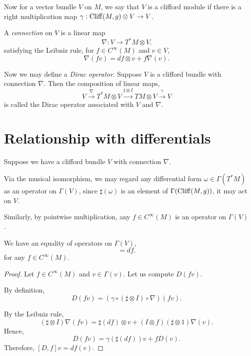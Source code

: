 Now for a vector bundle $V$ on $M$, we say that $V$ is a clifford module
if there is a right multiplication map $\gamma:\operatorname{Cliff}(M,g) \otimes V\rightarrow V$. 

A \emph{connection} on $V$ is a linear map
\begin{equation*}
    \nabla:V\rightarrow T^*M\otimes V.
\end{equation*}
satisfying the Leibniz rule, for $f \in C^\infty(M)$ and $v \in V$,
\begin{equation*}
    \nabla(fv) = df \otimes v +f\nabla(v).
\end{equation*}

Now we may define a \emph{Dirac operator}. Suppose $V$
is a clifford bundle with connection $\nabla$. Then the composition of linear maps,
\begin{equation*}
    V \xrightarrow{\nabla} T^*M \otimes V \xrightarrow{\sharp\otimes I} TM\otimes V \xrightarrow{\gamma} V
\end{equation*}
is called the Dirac operator associated with $V$ and $\nabla$. 

\section{Relationship with differentials}
Suppose we have a clifford bundle $V$ with connection $\nabla$. 

Via the musical isomorphism, we may regard any differential form $\omega \in \Gamma(T^*M)$
as an operator on $\Gamma(V)$, since $\sharp(\omega)$ is an element of $\Gamma(\operatorname{Cliff}(M,g))$,
it may act on $V$.

Similarly, by pointwise multiplication, any $f \in C^\infty(M)$ is an operator
on $\Gamma(V)$. 
\begin{theorem}
    We have an equality of operators on $\Gamma(V)$,
    \begin{equation*}
        [D,f] = df.
    \end{equation*}
    for any $f \in C^\infty(M)$.
\end{theorem}
\begin{proof}
    Let $f \in C^\infty(M)$ and $v \in \Gamma(v)$. Let 
    us compute $D(fv)$.
    
    By definition,
    \begin{equation*}
        D(fv) = (\gamma\circ(\sharp\otimes I)\circ\nabla)(fv).
    \end{equation*}
    
    By the Leibniz rule,
    \begin{equation*}
        (\sharp\otimes I)\nabla(fv) = \sharp(df)\otimes v + (I\otimes f)(\sharp \otimes 1)\nabla(v).
    \end{equation*}
    Hence,
    \begin{equation*}
        D(fv) = \gamma(\sharp(df))v + fD(v).
    \end{equation*}
    Therefore, $[D,f]v = df(v)$.
\end{proof}
